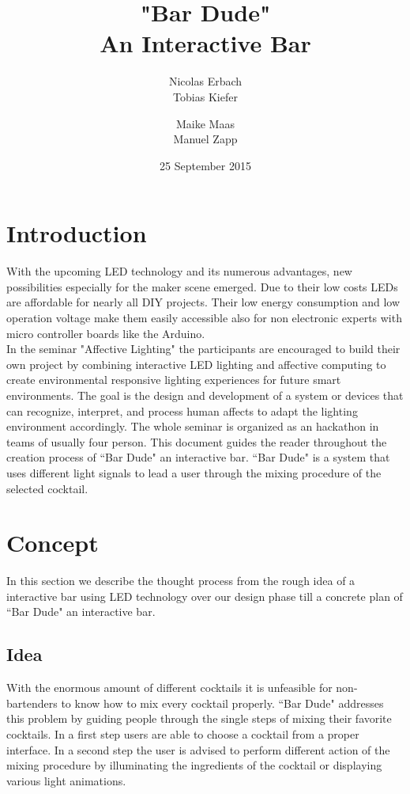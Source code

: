 \documentclass{acm_proc_article-sp}
\begin{document}
\title{"Bar Dude" \\ An Interactive Bar}

\author{
\alignauthor
Nicolas Erbach\\
\alignauthor
Tobias Kiefer\\
\and
\alignauthor Maike Maas\\
\alignauthor Manuel Zapp\\
}
\date{25 September 2015}

\maketitle

\section{Introduction}
With the upcoming LED technology and its numerous advantages, new possibilities especially for the maker scene emerged. Due to their low costs LEDs are affordable for nearly all DIY projects. Their low energy consumption and low operation voltage make them easily accessible also for non electronic experts with micro controller boards like the Arduino.\\
In the seminar "Affective Lighting" the participants are encouraged to build their own project by combining interactive LED lighting and affective computing to create environmental responsive lighting experiences for future smart environments. The goal is the design and development of a system or devices that can recognize, interpret, and process human affects to adapt the lighting environment accordingly. The whole seminar is organized as an hackathon in teams of usually four person. This document guides the reader throughout the creation process of ``Bar Dude" an interactive bar. ``Bar Dude" is a system that uses different light signals to lead a user through the mixing procedure of the selected cocktail.

\section{Concept}
In this section we describe the thought process from the rough idea of a interactive bar using LED technology over our design phase till a concrete plan of ``Bar Dude" an interactive bar.
\subsection{Idea}
With the enormous amount of different cocktails it is unfeasible for non-bartenders to know how to mix every cocktail properly. ``Bar Dude" addresses this problem by guiding people through the single steps of mixing their favorite cocktails. In a first step users are able to choose a cocktail from a proper interface. In a second step the user is advised to perform different action of the mixing procedure by illuminating the ingredients of the cocktail or displaying various light animations.
\end{document}
